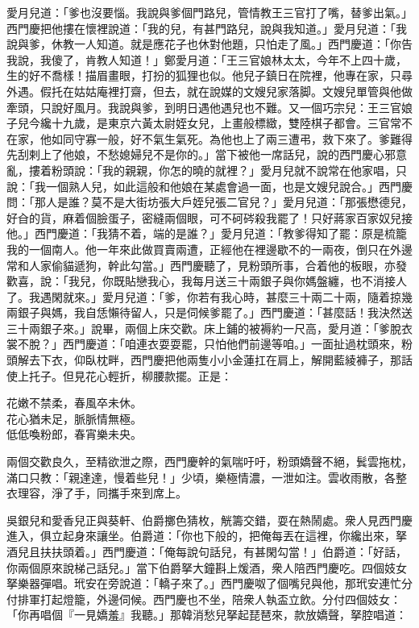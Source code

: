 愛月兒道：「爹也沒要惱。我說與爹個門路兒，管情教王三官打了嘴，替爹出氣。」西門慶把他摟在懷裡說道：「我的兒，有甚門路兒，說與我知道。」愛月兒道：「我說與爹，休教一人知道。就是應花子也休對他題，只怕走了風。」西門慶道：「你告我說，我傻了，肯教人知道！」鄭愛月道：「王三官娘林太太，今年不上四十歲，生的好不喬樣！描眉畫眼，打扮的狐狸也似。{}他兒子鎮日在院裡，他專在家，只尋外遇。假托在姑姑庵裡打齋，但去，就在說媒的文嫂兒家落脚。文嫂兒單管與他做牽頭，只說好風月。我說與爹，到明日遇他遇兒也不難。又一個巧宗兒：王三官娘子兒今纔十九歲，是東京六黃太尉姪女兒，上畫般標緻，雙陸棋子都會。三官常不在家，他如同守寡一般，好不氣生氣死。為他也上了兩三遭弔，救下來了。爹難得先刮剌上了他娘，不愁媳婦兒不是你的。」{}當下被他一席話兒，說的西門慶心邪意亂，摟着粉頭說：「我的親親，你怎的曉的就裡？」愛月兒就不說常在他家唱，只說：「我一個熟人兒，如此這般和他娘在某處會過一面，也是文嫂兒說合。」西門慶問：「那人是誰？莫不是大街坊張大戶姪兒張二官兒？」{}愛月兒道：「那張懋德兒，好㒲的貨，麻着個臉蛋子，密縫兩個眼，可不砢硶殺我罷了！{}只好蔣家百家奴兒接他。」西門慶道：「我猜不着，端的是誰？」愛月兒道：「教爹得知了罷：原是梳籠我的一個南人。他一年來此做買賣兩遭，正經他在裡邊歇不的一兩夜，倒只在外邊常和人家偷貓遞狗，幹此勾當。」西門慶聽了，見粉頭所事，合着他的板眼，亦發歡喜，說：「我兒，你既貼戀我心，我每月送三十兩銀子與你媽盤纏，也不消接人了。我遇閑就來。」愛月兒道：「爹，你若有我心時，甚麼三十兩二十兩，隨着掠幾兩銀子與媽，我自恁懶待留人，只是伺候爹罷了。」西門慶道：「甚麼話！我決然送三十兩銀子來。」說畢，兩個上床交歡。床上鋪的被褥約一尺高，愛月道：「爹脫衣裳不脫？」西門慶道：「咱連衣耍耍罷，只怕他們前邊等咱。」一面扯過枕頭來，粉頭解去下衣，仰臥枕畔，西門慶把他兩隻小小金蓮扛在肩上，解開藍綾褲子，那話使上托子。但見花心輕折，柳腰款擺。正是：

\begin{myquote} 
花嫩不禁柔，春風卒未休。\\花心猶未足，脈脈情無極。\\低低喚粉郎，春宵樂未央。{}
\end{myquote} 

兩個交歡良久，至精欲泄之際，西門慶幹的氣喘吁吁，粉頭嬌聲不絕，鬂雲拖枕，滿口只教：「親達達，慢着些兒！」少頃，樂極情濃，一泄如注。雲收雨散，各整衣理容，淨了手，同攜手來到席上。

吳銀兒和愛香兒正與葵軒、伯爵擲色猜枚，觥籌交錯，耍在熱鬧處。衆人見西門慶進入，俱立起身來讓坐。伯爵道：「你也下般的，把俺每丟在這裡，你纔出來，拏酒兒且扶扶頭着。」西門慶道：「俺每說句話兒，有甚閑勾當！」伯爵道：「好話，你兩個原來說梯己話兒。」當下伯爵拏大鐘斟上煖酒，衆人陪西門慶吃。四個妓女拏樂器彈唱。玳安在旁說道：「轎子來了。」西門慶呶了個嘴兒與他，那玳安連忙分付排軍打起燈籠，外邊伺候。西門慶也不坐，陪衆人執盃立飲。分付四個妓女：「你再唱個『一見嬌羞』我聽。」那韓消愁兒拏起琵琶來，款放嬌聲，拏腔唱道：


